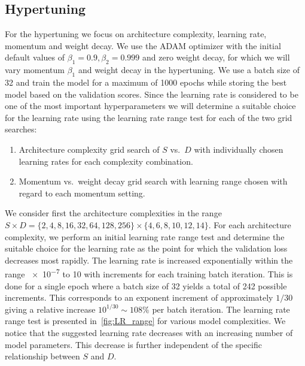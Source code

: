 \subsection{Hypertuning}
For the hypertuning we focus on architecture complexity, learning rate, momentum and weight decay. We use the ADAM optimizer with the initial default values of $\beta_1 = 0.9, \beta_2 = 0.999$ and zero weight decay, for which we will vary momentum $\beta_1$ and weight decay in the hypertuning. We use a batch size of 32 and train the model for a maximum of 1000 epochs while storing the best model based on the validation scores.
Since the learning rate is considered to be one of the most important hyperparameters we will determine a suitable choice for the learning rate using the learning rate range test for each of the two grid searches:
\begin{enumerate}
  \item Architecture complexity grid search of $S$ vs.\ $D$ with individually chosen learning rates for each complexity combination.
  \item Momentum vs.\ weight decay grid search with learning range chosen with regard to each momentum setting.
\end{enumerate}
We consider first the architecture complexities in the range $S \times D =
\{2,4,8,16,32,64,128,256\} \times \{4,6,8,10,12,14\}$. For each architecture
complexity, we perform an initial learning rate range test and determine the suitable choice for the learning rate as the point for which the validation loss decreases most rapidly. The learning rate is increased exponentially within the range \num{e-7} to 10 with increments for each training batch iteration. This is done for a single epoch where a batch size of 32 yields a total of 242 possible increments. This corresponds to an exponent increment of approximately $1/30$ giving a relative increase $10^{1/30} \sim 108\%$ per batch iteration. The learning rate range test is presented in~\cref{fig:LR_range} for various model complexities. We notice that the suggested learning rate decreases with an increasing number of model parameters. This decrease is further independent of the specific relationship between $S$ and $D$.

